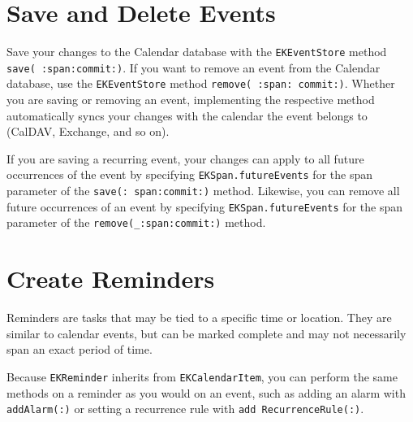 \documentclass{article}
\begin{document}
\section*{Save and Delete Events}

\noindent{}

Save your changes to the Calendar database with the \texttt{EKEventStore} method \texttt{save( :span:commit:)}. If you
want to remove an event from the Calendar database, use the \texttt{EKEventStore} method \texttt{remove( :span:
commit:)}. Whether you are saving or removing an event, implementing the respective method automatically
syncs your changes with the calendar the event belongs to (CalDAV, Exchange, and so on).

If you are saving a recurring event, your changes can apply to all future occurrences of the event by specifying
\texttt{EKSpan.futureEvents} for the span parameter of the \texttt{save(: span:commit:)} method. Likewise, you can
remove all future occurrences of an event by specifying \texttt{EKSpan.futureEvents} for the span parameter of the
\texttt{remove(_:span:commit:)} method.

\noindent{}

\section*{Create Reminders}
Reminders are tasks that may be tied to a specific time or location. They are similar to calendar events, but can be
marked complete and may not necessarily span an exact period of time.

Because \texttt{EKReminder} inherits from \texttt{EKCalendarItem}, you can perform the same methods on a reminder as
you would on an event, such as adding an alarm with \texttt{addAlarm(:)} or setting a recurrence rule with \texttt{add
RecurrenceRule(:)}.
\end{document}

